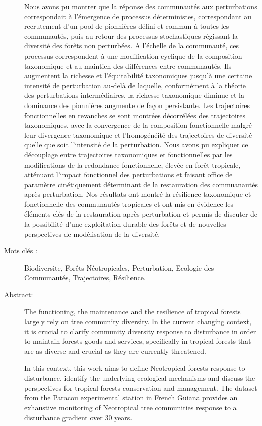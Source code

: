 \documentclass[
  11pt,
  french,
  A4paper,
  extrafontsizes,onecolumn,openright
  ]{memoir}
\begin{document}
\begin{normalsize}
\begin{description}
Nous avons pu montrer que la réponse des communautés aux perturbations
correspondait à l'émergence de processus déterministes, correspondant au
recrutement d'un pool de pionnières défini et commun à toutes les
communautés, puis au retour des processus stochastiques régissant la
diversité des forêts non perturbées. A l'échelle de la communauté, ces
processus correspondent à une modification cyclique de la composition
taxonomique et au maintien des différences entre communautés. Ils
augmentent la richesse et l'équitabilité taxonomiques jusqu'à une
certaine intensité de perturbation au-delà de laquelle, conformément à
la théorie des perturbations intermédiaires, la richesse taxonomique
diminue et la dominance des pionnières augmente de façon persistante.
Les trajectoires fonctionnelles en revanches se sont montrées
décorrélées des trajectoires taxonomiques, avec la convergence de la
composition fonctionnelle malgré leur divergence taxonomique et
l'homogénéité des trajectoires de diversité quelle que soit l'intensité
de la perturbation. Nous avons pu expliquer ce découplage entre
trajectoires taxonomiques et fonctionnelles par les modifications de la
redondance fonctionnelle, élevée en forêt tropicale, atténuant l'impact
fonctionnel des perturbations et faisant office de paramètre
cinétiquement déterminant de la restauration des commuanautés après
perturbation. Nos résultats ont montré la résilience taxonomique et
fonctionnelle des communautés tropicales et ont mis en évidence les
éléments clés de la restauration après perturbation et permis de
discuter de la possibilité d'une exploitation durable des forêts et de
nouvelles perspectives de modélisation de la diversité.\newline

\item[Mots clés :]
Biodiversite, Forêts Néotropicales, Perturbation, Ecologie des Communautés, Trajectoires, Résilience.
~\\

\item[Abstract:]
The functioning, the maintenance and the resilience of tropical forests
largely rely on tree community diversity. In the current changing
context, it is crucial to clarify community diversity response to
disturbance in order to maintain forests goods and services,
specifically in tropical forests that are as diverse and crucial as they
are currently threatened.

In this context, this work aims to define Neotropical forests response
to disturbance, identify the underlying ecological mechanisms and
discuss the perspectives for tropical forests conservation and
management. The dataset from the Paracou experimental station in French
Guiana provides an exhaustive monitoring of Neotropical tree communities
response to a disturbance gradient over 30 years.


\end{description}
\end{normalsize}
\end{document}
